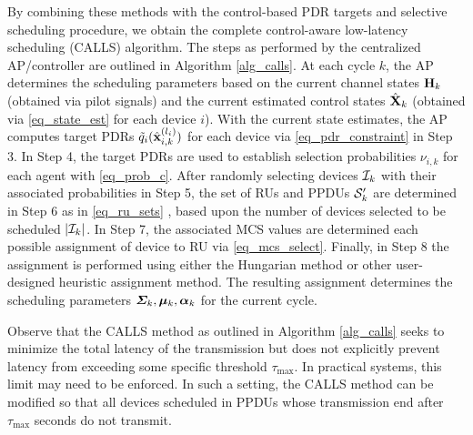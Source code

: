 By combining these methods with the control-based PDR targets and selective scheduling procedure, we obtain the complete control-aware low-latency scheduling (CALLS) algorithm. The steps as performed by the centralized AP/controller are outlined in Algorithm \ref{alg_calls}. At each cycle $k$, the AP determines the scheduling parameters based on the current channel states ${\mathbf H}_k$ (obtained via pilot signals) and the current estimated control states ${\hat{\mathbf X} }_k$ (obtained via \eqref{eq_state_est} for each device $i$). With the current state estimates, the AP computes target PDRs  ${\tilde q}_i({\hat{\mathbf x} }^{(l_i)}_{i,k})$ for each device via \eqref{eq_pdr_constraint} in Step 3. In Step 4, the target PDRs are used to establish selection probabilities $\nu_{i,k}$ for each agent with \eqref{eq_prob_c}. After randomly selecting devices ${\mathcal I}_k$ with their associated probabilities in Step 5, the set of RUs and PPDUs ${\mathcal S}'_k$ are determined in Step 6 as in \eqref{eq_ru_sets} , based upon the number of devices selected to be scheduled $|{\mathcal I}_k|$. In Step 7, the associated MCS values are determined each possible assignment of device to RU via \eqref{eq_mcs_select}. Finally, in Step 8 the assignment is performed using either the Hungarian method \cite{kuhn1955hungarian} or other user-designed heuristic assignment method. The resulting assignment determines the scheduling parameters $\boldsymbol{\Sigma}_k, \boldsymbol{\mu}_k, \boldsymbol{\alpha}_k$ for the current cycle. 
 
 \begin{remark}\label{remark_latency}\normalfont
 Observe that the CALLS method as outlined in Algorithm \ref{alg_calls} seeks to minimize the total latency of the transmission but does not explicitly prevent latency from exceeding some specific threshold $\tau_{\max}$. In practical systems, this limit may need to be enforced. In such a setting, the CALLS method can be modified so that all devices scheduled in PPDUs whose transmission end after $\tau_{\max}$ seconds do not transmit. 
 \end{remark}
